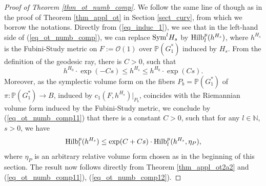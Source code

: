\documentclass[12pt]{article}
\numberwithin{equation}{section}
\theoremstyle{theorem}
\theoremstyle{definition}
\theoremstyle{remark}
\newcommand{\nat}{\mathbb{N}}
\begin{document}
	\begin{proof}[Proof of Theorem \ref{thm_ot_numb_comp}]
		We follow the same line of though as in the proof of Theorem \ref{thm_appl_ot} in Section \ref{sect_curv}, from which we borrow the notations.
		Directly from (\ref{eq_induc_1}), we see that in the left-hand side of (\ref{eq_ot_numb_comp}), we can replace ${\rm{Sym}}^l H_s$ by ${\rm{Hilb}}_{l}^{p}(h^{H_s})$, where $h^{H_s}$ is the Fubini-Study metric on $F := \mathscr{O}(1)$ over $\mathbb{P}(G_1^*)$ induced by $H_s$.
		From the definition of the geodesic ray, there is $C > 0$, such that
		\begin{equation}\label{eq_ot_numb_comp11}
			 h^{H_0} \cdot \exp(-Cs) \leq h^{H_s} \leq h^{H_0} \cdot \exp(Cs).
		\end{equation}
		Moreover, as the symplectic volume form on the fibers $P_b = \mathbb{P}(G_1^*)$ of $\pi : \mathbb{P}(G_1^*) \to B$, induced by $c_1(F, h^{H_s})|_{P_b}$, coincides with the Riemannian volume form induced by the Fubini-Study metric, we conclude by (\ref{eq_ot_numb_comp11}) that there is a constant $C > 0$, such that for any $l \in \nat$, $s > 0$, we have
		\begin{equation}\label{eq_ot_numb_comp12}
			{\rm{Hilb}}_{l}^{p}(h^{H_s})
			\leq
			\exp(C + C s)
			\cdot
			{\rm{Hilb}}_{l}^{p}(h^{H_s}, \eta_P),
		\end{equation}
		where $\eta_P$ is an arbitrary relative volume form chosen as in the beginning of this section.
		The result now follows directly from Theorem \ref{thm_appl_ot2a2} and (\ref{eq_ot_numb_comp11}), (\ref{eq_ot_numb_comp12}).
	\end{proof}
\end{document}
